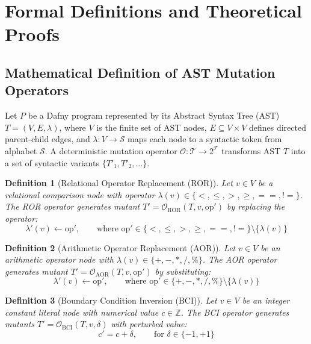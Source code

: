 \documentclass{article}
\newtheorem{definition}{Definition}
\begin{document}



\clearpage
\appendix

\section{Formal Definitions and Theoretical Proofs}
\label{app:proofs}

\subsection{Mathematical Definition of AST Mutation Operators}

Let $P$ be a Dafny program represented by its Abstract Syntax Tree (AST) $T = (V, E, \lambda)$, where $V$ is the finite set of AST nodes, $E \subseteq V \times V$ defines directed parent-child edges, and $\lambda: V \to \mathcal{S}$ maps each node to a syntactic token from alphabet $\mathcal{S}$. A deterministic mutation operator $\mathcal{O}: \mathcal{T} \to 2^{\mathcal{T}}$ transforms AST $T$ into a set of syntactic variants $\{T'_1, T'_2, \dots\}$.

\begin{definition}[Relational Operator Replacement (ROR)]
Let $v \in V$ be a relational comparison node with operator $\lambda(v) \in \{<, \le, >, \ge, ==, !=\}$. The ROR operator generates mutant $T' = \mathcal{O}_{\text{ROR}}(T, v, \text{op}')$ by replacing the operator:
\begin{equation}
\lambda'(v) \leftarrow \text{op}', \qquad \text{where } \text{op}' \in \{<, \le, >, \ge, ==, !=\} \setminus \{\lambda(v)\}
\end{equation}
\end{definition}

\begin{definition}[Arithmetic Operator Replacement (AOR)]
Let $v \in V$ be an arithmetic operator node with $\lambda(v) \in \{+, -, *, /, \%\}$. The AOR operator generates mutant $T' = \mathcal{O}_{\text{AOR}}(T, v, \text{op}')$ by substituting:
\begin{equation}
\lambda'(v) \leftarrow \text{op}', \qquad \text{where } \text{op}' \in \{+, -, *, /, \%\} \setminus \{\lambda(v)\}
\end{equation}
\end{definition}

\begin{definition}[Boundary Condition Inversion (BCI)]
Let $v \in V$ be an integer constant literal node with numerical value $c \in \mathbb{Z}$. The BCI operator generates mutants $T' = \mathcal{O}_{\text{BCI}}(T, v, \delta)$ with perturbed value:
\begin{equation}
c' = c + \delta, \qquad \text{for } \delta \in \{-1, +1\}
\end{equation}
\end{definition}
\end{document}
